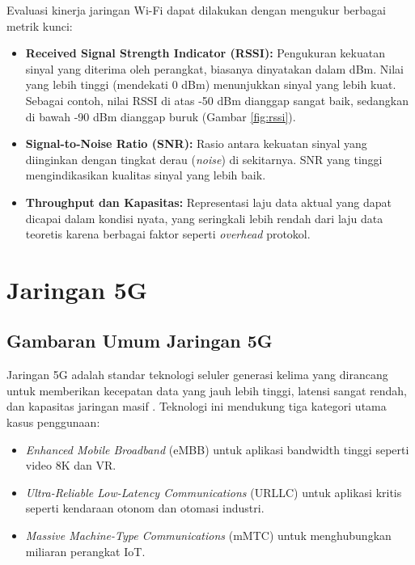 Evaluasi kinerja jaringan Wi-Fi dapat dilakukan dengan mengukur berbagai metrik kunci:
\begin{itemize}
    \item \textbf{Received Signal Strength Indicator (RSSI):} Pengukuran kekuatan sinyal yang diterima oleh perangkat, biasanya dinyatakan dalam dBm. Nilai yang lebih tinggi (mendekati 0 dBm) menunjukkan sinyal yang lebih kuat. Sebagai contoh, nilai RSSI di atas -50 dBm dianggap sangat baik, sedangkan di bawah -90 dBm dianggap buruk (Gambar \ref{fig:rssi}).
    \item \textbf{Signal-to-Noise Ratio (SNR):} Rasio antara kekuatan sinyal yang diinginkan dengan tingkat derau (\textit{noise}) di sekitarnya. SNR yang tinggi mengindikasikan kualitas sinyal yang lebih baik.
    \item \textbf{Throughput dan Kapasitas:} Representasi laju data aktual yang dapat dicapai dalam kondisi nyata, yang seringkali lebih rendah dari laju data teoretis karena berbagai faktor seperti \textit{overhead} protokol.
\end{itemize}



\section{Jaringan 5G}

\subsection{Gambaran Umum Jaringan 5G}
Jaringan 5G adalah standar teknologi seluler generasi kelima yang dirancang untuk memberikan kecepatan data yang jauh lebih tinggi, latensi sangat rendah, dan kapasitas jaringan masif \cite{qualcomm_5g_overview}. Teknologi ini mendukung tiga kategori utama kasus penggunaan: 

\begin{itemize}
    \item \textit{Enhanced Mobile Broadband} (eMBB) untuk aplikasi bandwidth tinggi seperti video 8K dan VR.
    \item \textit{Ultra-Reliable Low-Latency Communications} (URLLC) untuk aplikasi kritis seperti kendaraan otonom dan otomasi industri.
    \item \textit{Massive Machine-Type Communications} (mMTC) untuk menghubungkan miliaran perangkat IoT.
\end{itemize}

